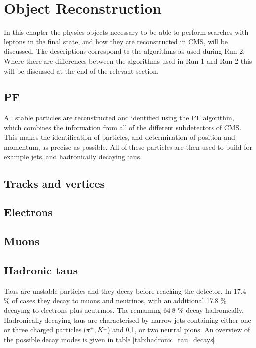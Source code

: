 \chapter{Object Reconstruction}
\label{chap:objects}

In this chapter the physics objects necessary to be able to perform searches with \Pgt leptons
in the final state, and how they are reconstructed in \ac{CMS}, will be discussed. The 
descriptions correspond to the algorithms as used during Run 2. Where there are differences
between the algorithms used in Run 1 and Run 2 this will be discussed at the end
of the relevant section.

\section{\acl{PF}}
\label{sec:objects_pf}
All stable particles are reconstructed and identified using the \ac{PF} algorithm, which
combines the information from all of the different subdetectors of \ac{CMS}. This makes
the identification of particles, and determination of position and momentum, as precise
as possible. All of these particles are then used to build for example jets, \MET and hadronically
decaying taus.



\section{Tracks and vertices}
\label{sec:objects_pv}

\section{Electrons}
\label{sec:objects_ele}

\section{Muons}
\label{sec:objects_muo}

\section{Hadronic taus}
\label{sec:objects_tau}
Taus are unstable particles and they decay before reaching the detector. In 17.4 \% of 
cases they decay to muons and neutrinos, with an additional 17.8 \% decaying to electrons
plus neutrinos. The remaining 64.8 \% decay hadronically. Hadronically decaying
taus are characterised by narrow jets containing either one or three charged
particles ($\pi^{\pm}, K^{\pm}$) and 0,1, or two neutral pions. An overview
of the possible decay modes is given in table \ref{tab:hadronic_tau_decays}


